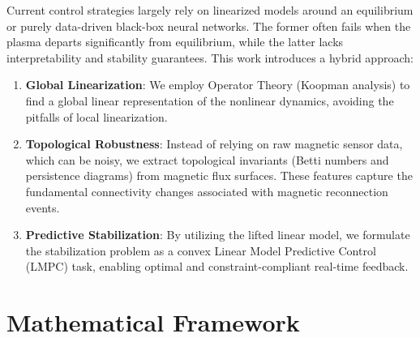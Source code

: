 \documentclass{article}
\begin{document}
Current control strategies largely rely on linearized models around an equilibrium or purely data-driven black-box neural networks. The former often fails when the plasma departs significantly from equilibrium, while the latter lacks interpretability and stability guarantees. This work introduces a hybrid approach:
\begin{enumerate}
    \item \textbf{Global Linearization}: We employ Operator Theory (Koopman analysis) to find a global linear representation of the nonlinear dynamics, avoiding the pitfalls of local linearization.
    \item \textbf{Topological Robustness}: Instead of relying on raw magnetic sensor data, which can be noisy, we extract topological invariants (Betti numbers and persistence diagrams) from magnetic flux surfaces. These features capture the fundamental connectivity changes associated with magnetic reconnection events.
    \item \textbf{Predictive Stabilization}: By utilizing the lifted linear model, we formulate the stabilization problem as a convex Linear Model Predictive Control (LMPC) task, enabling optimal and constraint-compliant real-time feedback.
\end{enumerate}

\section{Mathematical Framework}
\end{document}
